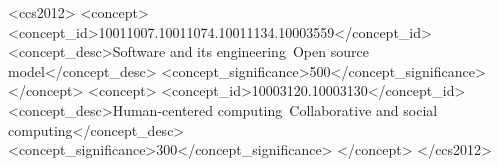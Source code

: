 \begin{CCSXML}
<ccs2012>
<concept>
<concept_id>10011007.10011074.10011134.10003559</concept_id>
<concept_desc>Software and its engineering~Open source model</concept_desc>
<concept_significance>500</concept_significance>
</concept>
<concept>
<concept_id>10003120.10003130</concept_id>
<concept_desc>Human-centered computing~Collaborative and social computing</concept_desc>
<concept_significance>300</concept_significance>
</concept>
</ccs2012>
\end{CCSXML}

\maketitle
